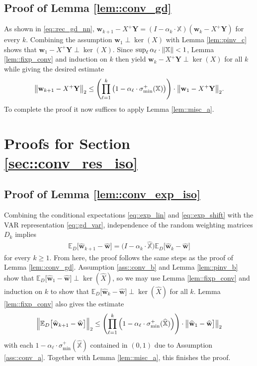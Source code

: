 \documentclass{article}
\newcommand*{\E}{\mathbb{E}} %
\newcommand*{\bbX}{\mathbb{X}}
\newcommand*{\bfY}{\mathbf{Y}}
\newcommand*{\bfw}{\mathbf{w}}
\newcommand*{\pinv}{^{+}}
\newcommand*{\sigminp}{\sigma_{\mathrm{min}}^+}
\DeclarePairedDelimiter{\norm}{\lVert}{\rVert}
\newcommand{\weight}{\bfw}
\newcommand{\whweight}{\widehat{\bfw}}
\newcommand{\whX}{\widehat{X}}
\newcommand{\whbbX}{\widehat{\bbX}}
\begin{document}
\subsection{Proof of Lemma \ref{lem::conv_gd}}

As shown in \eqref{eq::rec_gd_nn}, $\bfw_{k + 1} - X\pinv \bfY = (I - \alpha_k
\cdot \bbX) (\bfw_k - X\pinv \bfY)$ for every $k$. Combining the assumption
$\bfw_1 \perp \ker(X)$ with Lemma \ref{lem::pinv_c} shows that $\bfw_1 - X\pinv
\bfY \perp \ker(X)$. Since $\sup_{\ell} \alpha_\ell \cdot \norm{\bbX} < 1$,
Lemma \ref{lem::fixp_conv} and induction on $k$ then yield $\bfw_k - X\pinv \bfY
\perp \ker(X)$ for all $k$ while giving the desired estimate \begin{align*}
  \norm[\big]{\weight_{k + 1} - X\pinv \bfY}_2 \leq \left(\prod_{\ell = 1}^k
  \big(1 - \alpha_\ell \cdot \sigminp(\bbX)\big)\right) \cdot
  \norm[\big]{\weight_1 - X\pinv \bfY}_2.
\end{align*} To complete the proof it now suffices to apply Lemma
\ref{lem::misc_a}.

\section{Proofs for Section \ref{sec::conv_res_iso}}

\subsection{Proof of Lemma \ref{lem::conv_exp_iso}}

Combining the conditional expectations \eqref{eq::exp_lin} and
\eqref{eq::exp_shift} with the VAR representation \eqref{eq::gd_var},
independence of the random weighting matrices $D_k$ implies \begin{align}
  \label{eq::exp_rec}
  \E_D\big[\whweight_{k + 1} - \whweight\big] = \big(I - \alpha_k \cdot
  \whbbX\big) \E_D\big[\whweight_k - \whweight\big]
\end{align} for every $k \geq 1$. From here, the proof follows the same steps
as the proof of Lemma \ref{lem::conv_gd}. Assumption \ref{ass::conv_b} and Lemma
\ref{lem::pinv_b} show that $\E_D\big[\whweight_1 - \whweight\big] \perp
\ker(\whX)$, so we may use Lemma \ref{lem::fixp_conv} and induction on $k$ to
show that $\E_D\big[\whweight_k - \whweight\big] \perp \ker(\whX)$ for all $k$.
Lemma \ref{lem::fixp_conv} also gives the estimate \begin{align*}
  \norm[\Big]{\E_D\big[\whweight_{k + 1} - \whweight\big]}_2 \leq
  \left(\prod_{\ell = 1}^k \Big(1 - \alpha_\ell \cdot
  \sigminp(\whbbX)\Big)\right) \cdot \norm[\big]{\whweight_1 - \whweight\big]}_2
\end{align*} with each $1 - \alpha_\ell \cdot \sigminp(\whbbX)$ contained in
$(0, 1)$ due to Assumption \ref{ass::conv_a}. Together with Lemma
\ref{lem::misc_a}, this finishes the proof.
\end{document}
